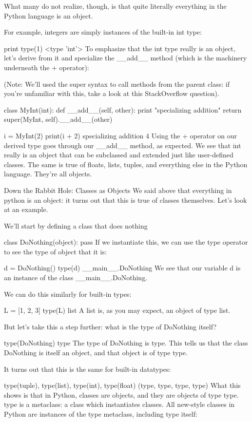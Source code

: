 What many do not realize, though, is that quite literally everything in the Python language is an object.

For example, integers are simply instances of the built-in int type:

print type(1)
<type 'int'>
To emphasize that the int type really is an object, let's derive from it and specialize the __add__ method (which is the machinery underneath the + operator):

(Note: We'll used the super syntax to call methods from the parent class: if you're unfamiliar with this, take a look at this StackOverflow question).

class MyInt(int):
    def __add__(self, other):
        print "specializing addition"
        return super(MyInt, self).__add__(other)

i = MyInt(2)
print(i + 2)
specializing addition
4
Using the + operator on our derived type goes through our __add__ method, as expected. We see that int really is an object that can be subclassed and extended just like user-defined classes. The same is true of floats, lists, tuples, and everything else in the Python language. They're all objects.

Down the Rabbit Hole: Classes as Objects
We said above that everything in python is an object: it turns out that this is true of classes themselves. Let's look at an example.

We'll start by defining a class that does nothing

class DoNothing(object):
    pass
If we instantiate this, we can use the type operator to see the type of object that it is:

d = DoNothing()
type(d)
__main__.DoNothing
We see that our variable d is an instance of the class __main__.DoNothing.

We can do this similarly for built-in types:

L = [1, 2, 3]
type(L)
list
A list is, as you may expect, an object of type list.

But let's take this a step further: what is the type of DoNothing itself?

type(DoNothing)
type
The type of DoNothing is type. This tells us that the class DoNothing is itself an object, and that object is of type type.

It turns out that this is the same for built-in datatypes:

type(tuple), type(list), type(int), type(float)
(type, type, type, type)
What this shows is that in Python, classes are objects, and they are objects of type type.  type is a metaclass: a class which instantiates classes. All new-style classes in Python are instances of the type metaclass, including type itself:

